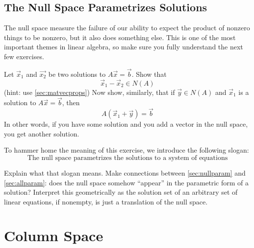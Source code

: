 \subsection{The Null Space Parametrizes Solutions}

The null space measure the failure of our ability to expect the product of nonzero things to be nonzero, but it also does something else.  
This is one of the most important themes in linear algebra, so make sure you fully understand the next few exercises.  
\begin{ImpEx}
  \label{sec:nullparam}
  Let $\vec{x}_1$ and $\vec{x_2}$ be two solutions to $A\vec{x}=\vec{b}$.
  Show that 
  \[\vec{x}_1 - \vec{x}_2 \in N(A)\]
  (hint: use \ref{sec:matvecprops})
  Now show, similarly, that if $\vec{y}\in N(A)$ and $\vec{x}_1$ is a solution to $A\vec{x}=\vec{b}$, then 
  \[A(\vec{x}_1+\vec{y})=\vec{b}\]
  In other words, if you have some solution and you add a vector in the null space, you get another solution.  
\end{ImpEx}
To hammer home the meaning of this exercise, we introduce the following slogan: 
\[\mbox{The null space parametrizes the solutions to a system of equations}\]
\begin{ImpEx}
  Explain what that slogan means.  
  Make connections between \ref{sec:nullparam} and \ref{sec:allparam}: does the null space somehow ``appear'' in the parametric form of a solution? 
  Interpret this geometrically as the solution set of an arbitrary set of linear equations, if nonempty, is just a translation of the null space.  
\end{ImpEx}
 
\exersisesh

\section{Column Space}

